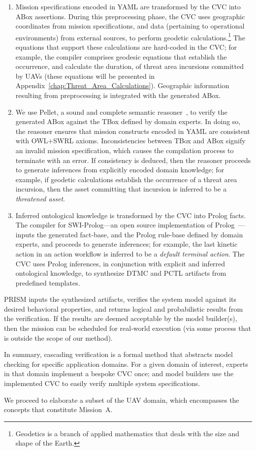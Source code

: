 \begin{enumerate}

\item Mission specifications encoded in YAML are transformed by the CVC into ABox assertions. During this preprocessing phase, the CVC uses geographic coordinates from mission specifications, and data (pertaining to operational environments) from external sources, to perform geodetic calculations.\footnote{Geodetics is a branch of applied mathematics that deals with the size and shape of the Earth.} The equations that support these calculations are hard-coded in the CVC; for example, the compiler comprises geodesic equations that establish the occurrence, and calculate the duration, of threat area incursions committed by UAVs (these equations will be presented in Appendix~\ref{chap:Threat_Area_Calculations}). Geographic information resulting from preprocessing is integrated with the generated ABox.

\item We use Pellet, a sound and complete semantic reasoner~\cite{Sirin_2007}, to verify the generated ABox against the TBox defined by domain experts. In doing so, the reasoner ensures that mission constructs encoded in YAML are consistent with OWL+SWRL axioms. Inconsistencies between TBox and ABox signify an invalid mission specification, which causes the compilation process to terminate with an error. If consistency is deduced, then the reasoner proceeds to generate inferences from explicitly encoded domain knowledge; for example, if geodetic calculations establish the occurrence of a threat area incursion, then the asset committing that incursion is inferred to be a \emph{threatened asset}.

\item Inferred ontological knowledge is transformed by the CVC into Prolog facts. The compiler for SWI-Prolog---an open source implementation of Prolog~\cite{SWI_Prolog}---inputs the generated fact-base, and the Prolog rule-base defined by domain experts, and proceeds to generate inferences; for example, the last kinetic action in an action workflow is inferred to be a \emph{default terminal action}. The CVC uses Prolog inferences, in conjunction with explicit and inferred ontological knowledge, to synthesize DTMC and PCTL artifacts from predefined templates.

\end{enumerate}

PRISM inputs the synthesized artifacts, verifies the system model against its desired behavioral properties, and returns logical and probabilistic results from the verification. If the results are deemed acceptable by the model builder(s), then the mission can be scheduled for real-world execution (via some process that is outside the scope of our method).

In summary, cascading verification is a formal method that abstracts model checking for specific application domains. For a given domain of interest, experts in that domain implement a bespoke CVC once; and model builders use the implemented CVC to easily verify multiple system specifications.

We proceed to elaborate a subset of the UAV domain, which encompasses the concepts that constitute Mission~A.
